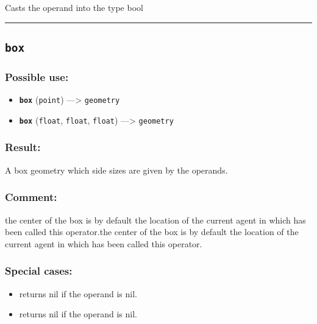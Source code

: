 \documentclass[]{book}
\providecommand{\tightlist}{%
  \setlength{\itemsep}{0pt}\setlength{\parskip}{0pt}}
\theoremstyle{definition}
\theoremstyle{definition}
\theoremstyle{definition}
\theoremstyle{remark}
\begin{document}
Casts the operand into the type bool

\begin{center}\rule{0.5\linewidth}{\linethickness}\end{center}

\subsection{\texorpdfstring{\texttt{box}}{box}}\label{box}

\subsubsection{Possible use:}\label{possible-use-76}

\begin{itemize}
\tightlist
\item
  \textbf{\texttt{box}} (\texttt{point}) ---\textgreater{}
  \texttt{geometry}
\item
  \textbf{\texttt{box}} (\texttt{float}, \texttt{float}, \texttt{float})
  ---\textgreater{} \texttt{geometry}
\end{itemize}

\subsubsection{Result:}\label{result-75}

A box geometry which side sizes are given by the operands.

\subsubsection{Comment:}\label{comment-16}

the center of the box is by default the location of the current agent in
which has been called this operator.the center of the box is by default
the location of the current agent in which has been called this
operator.

\subsubsection{Special cases:}\label{special-cases-26}

\begin{itemize}
\tightlist
\item
  returns nil if the operand is nil.\\
\item
  returns nil if the operand is nil.
\end{itemize}
\end{document}
